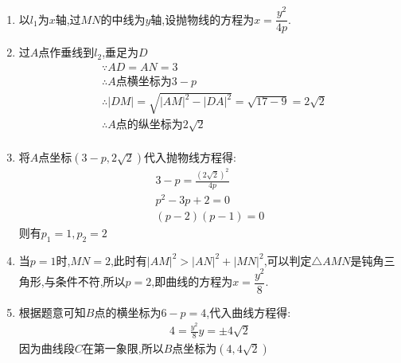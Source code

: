 \begin{questions}
\begin{center}
	\end{center}

	\begin{solution}
		\begin{enumerate}[label=\protect\circled{\arabic*}]
			\item 以$l_1$为$x$轴,过$MN$的中线为$y$轴,设抛物线的方程为$x=\dfrac{y^2}{4p}$.
			\item 过$A$点作垂线到$l_2$,垂足为$D$
			      \begin{align*}
				       & \because AD = AN = 3                                                  \\
				       & \therefore A \text{点横坐标为} 3-p                                         \\
				       & \therefore  |DM| = \sqrt{|AM|^2 - |DA|^2} = \sqrt{17 - 9} = 2\sqrt{2} \\
				       & \therefore A\text{点的纵坐标为}2\sqrt{2}                                    \\
			      \end{align*}
			\item 将$A$点坐标$(3-p, 2\sqrt{2})$代入抛物线方程得:
			      \begin{align*}
				      3-p = \frac{(2\sqrt{2})^2}{4p} \\
				      p^2 -3p + 2 = 0                \\
				      (p-2)(p-1) = 0
			      \end{align*}
			      则有$p_1 = 1, p_2 = 2$
			\item 当$p=1$时,$MN=2$,此时有$|AM|^2 > |AN|^2 +
				      |MN|^2$,可以判定$\triangle{AMN}$是钝角三角形,与条件不符,所以$p=2$,即曲线的方程为$x=\dfrac{y^2}{8}$.
			\item 根据题意可知$B$点的横坐标为$6-p=4$,代入曲线方程得:
			      \begin{align*}
				      4 = \frac{y^2}{8}
				      y = \pm4\sqrt{2}
			      \end{align*}
			      因为曲线段$C$在第一象限,所以$B$点坐标为$(4,4\sqrt{2})$


\end{enumerate}
\end{solution}
\end{questions}
